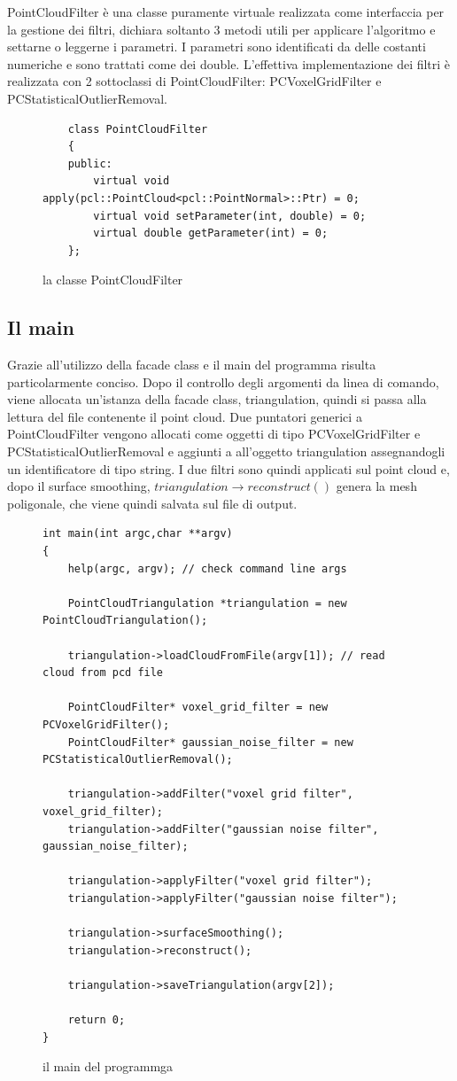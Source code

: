 \documentclass[a4paper,12pt]{article}
\begin{document}
	PointCloudFilter è una classe puramente virtuale realizzata come interfaccia per la gestione dei filtri,
	dichiara soltanto 3 metodi utili per applicare l'algoritmo e settarne o leggerne i parametri.
	I parametri sono identificati da delle costanti numeriche e sono trattati come dei double.
	L'effettiva implementazione dei filtri è realizzata con 2 sottoclassi di PointCloudFilter: PCVoxelGridFilter
	e PCStatisticalOutlierRemoval. 
	\begin{figure}[H]
	\begin{lstlisting}
	class PointCloudFilter
	{
	public:
    	virtual void apply(pcl::PointCloud<pcl::PointNormal>::Ptr) = 0;
    	virtual void setParameter(int, double) = 0;
    	virtual double getParameter(int) = 0;
	};
	\end{lstlisting}
	\label{fig:PointCloudFilter}
	\caption{la classe PointCloudFilter}
	\end{figure}
	\clearpage
	\subsection{Il main}
	Grazie all'utilizzo della facade class e il main del programma risulta particolarmente conciso.
	Dopo il controllo degli argomenti da linea di comando, viene allocata un'istanza della facade class, 
	triangulation, quindi si passa alla lettura del file contenente il point cloud. 
	Due puntatori generici a PointCloudFilter vengono allocati come oggetti di tipo PCVoxelGridFilter e
	PCStatisticalOutlierRemoval e aggiunti a all'oggetto triangulation assegnandogli un identificatore di
	tipo string. I due filtri sono quindi applicati sul point cloud e, dopo il surface smoothing, 
	$triangulation\rightarrow reconstruct()$ genera la mesh poligonale, che viene quindi salvata sul file di output.
	\begin{figure}[H]
	\begin{lstlisting}
int main(int argc,char **argv)
{
    help(argc, argv); // check command line args
    
    PointCloudTriangulation *triangulation = new PointCloudTriangulation();

    triangulation->loadCloudFromFile(argv[1]); // read cloud from pcd file

    PointCloudFilter* voxel_grid_filter = new PCVoxelGridFilter();
    PointCloudFilter* gaussian_noise_filter = new PCStatisticalOutlierRemoval();

    triangulation->addFilter("voxel grid filter", voxel_grid_filter);
    triangulation->addFilter("gaussian noise filter", gaussian_noise_filter);

    triangulation->applyFilter("voxel grid filter");
    triangulation->applyFilter("gaussian noise filter");

    triangulation->surfaceSmoothing();
    triangulation->reconstruct();

    triangulation->saveTriangulation(argv[2]);

    return 0;
}
	\end{lstlisting}
	\label{fig:main}
	\caption{il main del programmga}	
	\end{figure}
	\clearpage
\end{document}
